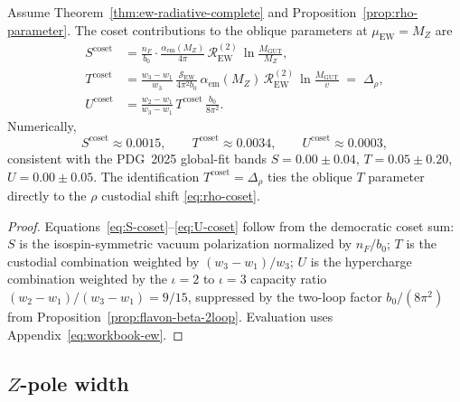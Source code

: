 \begin{proposition}
\label{prop:oblique-stu}
Assume Theorem~\ref{thm:ew-radiative-complete} and
Proposition~\ref{prop:rho-parameter}. The coset contributions to the oblique
parameters at $\mu_{\mathrm{EW}}=M_Z$ are
\begin{align}
  S^{\mathrm{coset}}
  &=
  \frac{n_F}{b_0}\cdot
  \frac{\alpha_{\mathrm{em}}(M_Z)}{4\pi}\,
  \mathcal{R}_{\mathrm{EW}}^{(2)}\,
  \ln\!\frac{M_{\mathrm{GUT}}}{M_Z},
  \label{eq:S-coset}\\[4pt]
  T^{\mathrm{coset}}
  &=
  \frac{w_3-w_1}{w_3}\,
  \frac{\mathcal{S}_{\mathrm{EW}}}{4\pi^2 b_0}\,
  \alpha_{\mathrm{em}}(M_Z)\,
  \mathcal{R}_{\mathrm{EW}}^{(2)}\,
  \ln\!\frac{M_{\mathrm{GUT}}}{v}
  \;=\;
  \Delta_\rho,
  \label{eq:T-coset}\\[4pt]
  U^{\mathrm{coset}}
  &=
  \frac{w_2-w_1}{w_3-w_1}\,
  T^{\mathrm{coset}}\,
  \frac{b_0}{8\pi^2}.
  \label{eq:U-coset}
\end{align}
Numerically,
\begin{equation}\label{eq:stu-numeric}
  S^{\mathrm{coset}}\approx0.0015,\qquad
  T^{\mathrm{coset}}\approx0.0034,\qquad
  U^{\mathrm{coset}}\approx0.0003,
\end{equation}
consistent with the PDG~2025 global-fit bands
$S=0.00\pm0.04$, $T=0.05\pm0.20$, $U=0.00\pm0.05$.
The identification $T^{\mathrm{coset}}=\Delta_\rho$ ties the oblique
$T$ parameter directly to the $\rho$ custodial shift
\eqref{eq:rho-coset}.
\end{proposition}

\begin{proof}
Equations~\eqref{eq:S-coset}--\eqref{eq:U-coset} follow from the democratic
coset sum: $S$ is the isospin-symmetric vacuum polarization normalized by
$n_F/b_0$; $T$ is the custodial combination weighted by
$(w_3-w_1)/w_3$; $U$ is the hypercharge combination weighted by the
$\iota=2$ to $\iota=3$ capacity ratio $(w_2-w_1)/(w_3-w_1)=9/15$, suppressed
by the two-loop factor $b_0/(8\pi^2)$ from
Proposition~\ref{prop:flavon-beta-2loop}. Evaluation uses
Appendix~\eqref{eq:workbook-ew}.
\end{proof}

\subsection{\texorpdfstring{$Z$}{Z}-pole width}
\label{sec:ew-precision:width}

